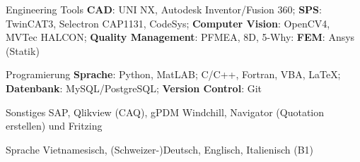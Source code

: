 

\begin{cvskills}


  \cvskill
    {Engineering Tools} %
    {\textbf{CAD}: UNI NX, Autodesk Inventor/Fusion 360; 
    \newline \textbf{SPS}: TwinCAT3, Selectron CAP1131, CodeSys;
    \newline \textbf{Computer Vision}: OpenCV4, MVTec HALCON;
    \newline \textbf{Quality Management}: PFMEA, 8D, 5-Why:
	\newline \textbf{FEM}: Ansys (Statik)} %

%

  \cvskill
    {Programierung} %
    {\textbf{Sprache}: Python, MatLAB; C/C++, Fortran, VBA, LaTeX; 
    	\newline \textbf{Datenbank}: MySQL/PostgreSQL;
    	\newline \textbf{Version Control}: Git
    	} %

  \cvskill
    {Sonstiges} %
    {SAP, Qlikview (CAQ), gPDM Windchill, Navigator (Quotation erstellen) und Fritzing} %

  \cvskill
    {Sprache} %
    {Vietnamesisch, (Schweizer-)Deutsch, Englisch, Italienisch (B1)} %

\end{cvskills}
